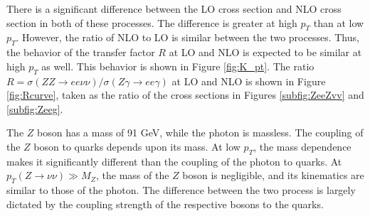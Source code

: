 \documentclass[12pt,a4paper,openright,twoside]{report}
\begin{document}
There is a significant difference between the LO cross section and NLO cross section in both of these processes. The difference is greater at high $p_T$ than at low $p_T$. However, the ratio of NLO to LO is similar between the two processes. Thus, the behavior of the transfer factor $R$ at LO and NLO is expected to be similar at high $p_T$ as well. This behavior is shown in Figure \ref{fig:K_pt}. The ratio $R = \sigma(ZZ\rightarrow ee\nu\nu)/\sigma(Z\gamma\rightarrow ee\gamma)$ at LO and NLO is shown in Figure \ref{fig:Rcurve}, taken as the ratio of the cross sections in Figures \ref{subfig:ZeeZvv} and \ref{subfig:Zeeg}.

The $Z$ boson has a mass of 91 GeV, while the photon is massless. The coupling of the $Z$ boson to quarks depends upon its mass. At low $p_T$, the mass dependence makes it significantly different than the coupling of the photon to quarks. At $p_T(Z\to\nu\nu) \gg M_Z$, the mass of the $Z$ boson is negligible, and its kinematics are similar to those of the photon. The difference between the two process is largely dictated by the coupling strength of the respective bosons to the quarks. 
\end{document}
